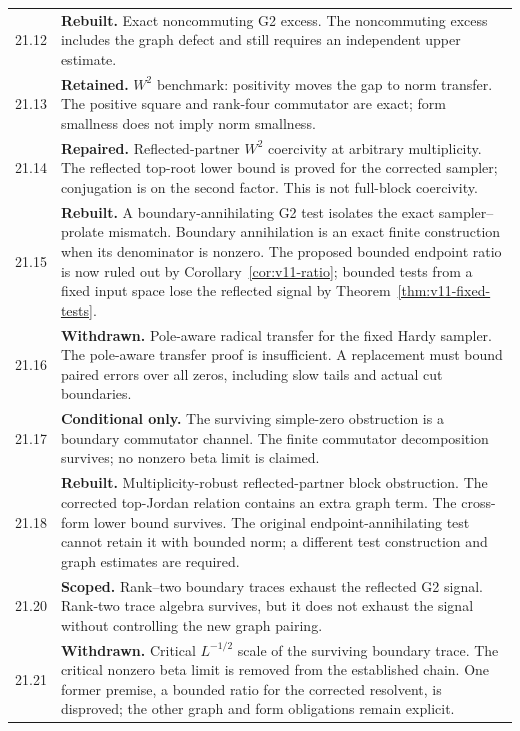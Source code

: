 \documentclass[11pt]{article}
\theoremstyle{remark}
\begin{document}
\begin{longtable}{@{}p{}p{}@{}}
21.12 & \textbf{Rebuilt.} Exact noncommuting G2 excess. The noncommuting excess includes the graph defect and still requires an independent upper estimate. \\[4pt]
21.13 & \textbf{Retained.} $W^2$ benchmark: positivity moves the gap to norm transfer. The positive square and rank-four commutator are exact; form smallness does not imply norm smallness. \\[4pt]
21.14 & \textbf{Repaired.} Reflected-partner $W^2$ coercivity at arbitrary multiplicity. The reflected top-root lower bound is proved for the corrected sampler; conjugation is on the second factor. This is not full-block coercivity. \\[4pt]
21.15 & \textbf{Rebuilt.} A boundary-annihilating G2 test isolates the exact sampler--prolate mismatch. Boundary annihilation is an exact finite construction when its denominator is nonzero. The proposed bounded endpoint ratio is now ruled out by Corollary~\ref{cor:v11-ratio}; bounded tests from a fixed input space lose the reflected signal by Theorem~\ref{thm:v11-fixed-tests}. \\[4pt]
21.16 & \textbf{Withdrawn.} Pole-aware radical transfer for the fixed Hardy sampler. The pole-aware transfer proof is insufficient. A replacement must bound paired errors over all zeros, including slow tails and actual cut boundaries. \\[4pt]
21.17 & \textbf{Conditional only.} The surviving simple-zero obstruction is a boundary commutator channel. The finite commutator decomposition survives; no nonzero beta limit is claimed. \\[4pt]
21.18 & \textbf{Rebuilt.} Multiplicity-robust reflected-partner block obstruction. The corrected top-Jordan relation contains an extra graph term. The cross-form lower bound survives. The original endpoint-annihilating test cannot retain it with bounded norm; a different test construction and graph estimates are required. \\[4pt]
21.20 & \textbf{Scoped.} Rank--two boundary traces exhaust the reflected G2 signal. Rank-two trace algebra survives, but it does not exhaust the signal without controlling the new graph pairing. \\[4pt]
21.21 & \textbf{Withdrawn.} Critical $L^{-1/2}$ scale of the surviving boundary trace. The critical nonzero beta limit is removed from the established chain. One former premise, a bounded ratio for the corrected resolvent, is disproved; the other graph and form obligations remain explicit. \\[4pt]

\end{longtable}
\end{document}
